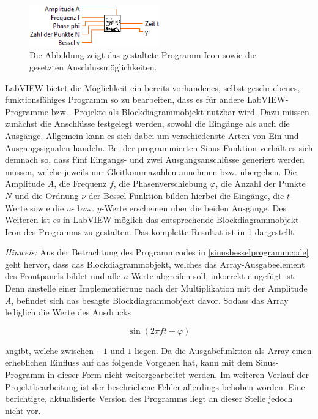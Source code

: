 \documentclass[
a4paper,
12pt,
pagesize,
ngerman
]{scrartcl}
\begin{document}
	\begin{figure}[H]
		\centering
		\includegraphics[width=0.5\textwidth]{EIRE2018Dateien/Tag1/sinusbessel-bilder/SinusBesselc}
		\caption{Die Abbildung zeigt das gestaltete Programm-Icon sowie die gesetzten Anschlussmöglichkeiten.}
		\label{sinusbesselicon}
	\end{figure}
	
	\noindent LabVIEW bietet die Möglichkeit ein bereits vorhandenes, selbst geschriebenes, funktionsfähiges Programm so zu bearbeiten, dass es für andere LabVIEW-Programme bzw. -Projekte als Blockdiagrammobjekt nutzbar wird. Dazu müssen zunächst die Anschlüsse festgelegt werden, sowohl die Eingänge als auch die Ausgänge. Allgemein kann es sich dabei um verschiedenste Arten von Ein-und Ausgangssignalen handeln. Bei der programmierten Sinus-Funktion verhält es sich demnach so, dass fünf Eingangs- und zwei Ausgangsanschlüsse generiert werden müssen, welche jeweils nur Gleitkommazahlen annehmen bzw. übergeben. Die Amplitude $A$, die Frequenz $f$, die Phasenverschiebung $\varphi$, die Anzahl der Punkte $N$ und die Ordnung $\nu$ der Bessel-Funktion bilden hierbei die Eingänge, die $t$-Werte sowie die $u$- bzw. $y$-Werte erscheinen über die beiden Ausgänge. Des Weiteren ist es in LabVIEW möglich das entsprechende Blockdiagrammobjekt-Icon des Programms zu gestalten. Das komplette Resultat ist in \cref{sinusbesselicon} dargestellt.
	
	\emph{Hinweis:} Aus der Betrachtung des Programmcodes in \cref{sinusbesselprogrammcode} geht hervor, dass das Blockdiagrammobjekt, welches das Array-Ausgabeelement des Frontpanels bildet und alle $u$-Werte abgreifen soll, inkorrekt eingefügt ist. Denn anstelle einer Implementierung nach der Multiplikation mit der Amplitude $A$, befindet sich das besagte Blockdiagrammobjekt davor. Sodass das Array lediglich die Werte des Ausdrucks
	
	\begin{equation}
	\sin(2\pi f t + \varphi)
	\end{equation}
	
	\noindent angibt, welche zwischen $-1$ und $1$ liegen. Da die Ausgabefunktion als Array einen erheblichen Einfluss auf das folgende Vorgehen hat, kann mit dem Sinus-Programm in dieser Form nicht weitergearbeitet werden. Im weiteren Verlauf der Projektbearbeitung ist der beschriebene Fehler allerdings behoben worden. Eine berichtigte, aktualisierte Version des Programms liegt an dieser Stelle jedoch nicht vor.
	\label{sinus_amp_fehler}
	
\end{document}
